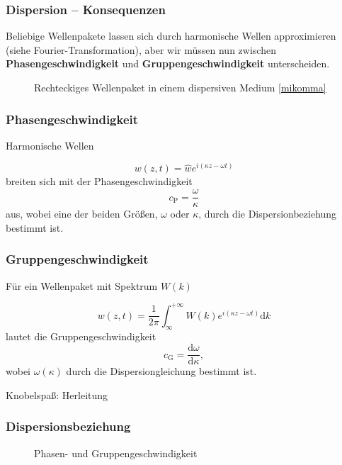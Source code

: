 \documentclass[hyperref={pdfpagemode=FullScreen, colorlinks=false}]{beamer}
\begin{document}
\begin{frame}
\frametitle{Dispersion -- Konsequenzen}
  Beliebige Wellenpakete lassen sich durch harmonische Wellen approximieren (siehe Fourier-Transformation), aber wir müssen nun zwischen \textbf{Phasengeschwindigkeit} und \textbf{Gruppengeschwindigkeit} unterscheiden.

\vspace{-7cm}  
\begin{figure}
\hspace{5cm}

\vspace{3cm}

\caption*{Rechteckiges Wellenpaket in einem dispersiven Medium \href{http://www.mikomma.de/optik/disp/dispimp.htm}{[mikomma]}}
\end{figure}
\end{frame}


\begin{frame}
\frametitle{Phasengeschwindigkeit}
Harmonische Wellen \hfill

 \begin{equation*}
  w(z,t)=\hat{w} e^{i(\kappa z-\omega t)}
 \end{equation*}
 breiten sich mit der Phasengeschwindigkeit
 \begin{equation*}
  c_\mathrm{P}=\frac{\omega}{\kappa}
 \end{equation*}
 aus, 
wobei eine der beiden Größen, $\omega$ oder $\kappa$, durch die Dispersionbeziehung bestimmt ist.
\end{frame}


\begin{frame}
\frametitle{Gruppengeschwindigkeit}
Für ein Wellenpaket mit Spektrum $W(k)$ \hfill

\begin{equation*}
  w(z,t)=\frac{1}{2\pi}\int_\infty^{+\infty} W(k)e^{i(\kappa z-\omega t)}\mathrm{d}k
 \end{equation*}
 lautet die Gruppengeschwindigkeit
 \begin{equation*}
  c_\mathrm{G}=\frac{\mathrm{d}\omega}{\mathrm{d}\kappa},
 \end{equation*}
wobei $\omega(\kappa)$ durch die Dispersiongleichung bestimmt ist.

\vfill
Knobelspaß: Herleitung 
\end{frame}


\begin{frame}
\frametitle{Dispersionsbeziehung}
\begin{figure}

\caption*{Phasen- und Gruppengeschwindigkeit}
\end{figure}
\end{frame}
\end{document}
